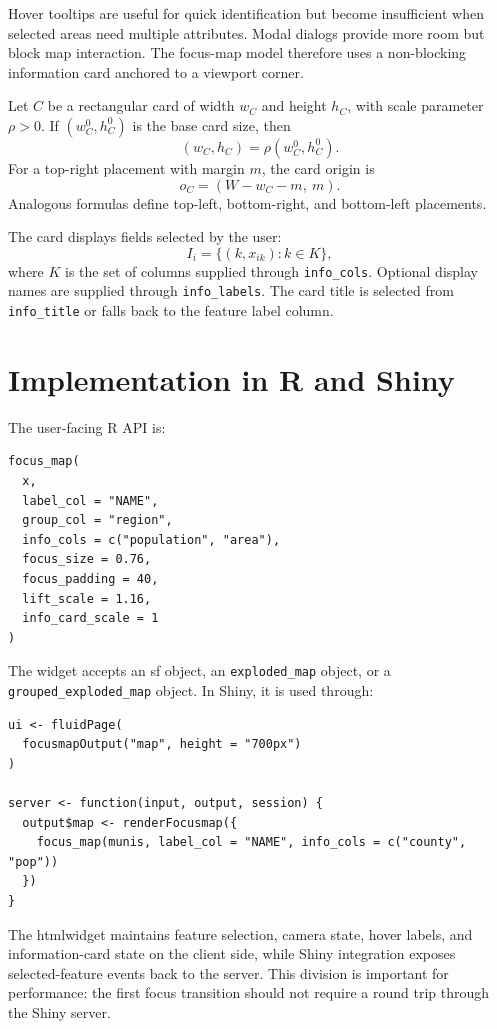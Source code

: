 \documentclass[12pt, a4paper]{article}
\numberwithin{equation}{section}
\begin{document}
Hover tooltips are useful for quick identification but become insufficient when selected areas need multiple attributes. Modal dialogs provide more room but block map interaction. The focus-map model therefore uses a non-blocking information card anchored to a viewport corner.

Let $C$ be a rectangular card of width $w_C$ and height $h_C$, with scale parameter $\rho > 0$. If $(w_C^0,h_C^0)$ is the base card size, then
\begin{equation}
  (w_C,h_C) = \rho (w_C^0,h_C^0).
\end{equation}
For a top-right placement with margin $m$, the card origin is
\begin{equation}
  o_C = (W - w_C - m,\ m).
\end{equation}
Analogous formulas define top-left, bottom-right, and bottom-left placements.

The card displays fields selected by the user:
\begin{equation}
  I_i = \{(k, x_{ik}) : k \in K\},
\end{equation}
where $K$ is the set of columns supplied through \texttt{info\_cols}. Optional display names are supplied through \texttt{info\_labels}. The card title is selected from \texttt{info\_title} or falls back to the feature label column.

\section{Implementation in R and Shiny}

The user-facing \textsf{R} API is:
\begin{lstlisting}
focus_map(
  x,
  label_col = "NAME",
  group_col = "region",
  info_cols = c("population", "area"),
  focus_size = 0.76,
  focus_padding = 40,
  lift_scale = 1.16,
  info_card_scale = 1
)
\end{lstlisting}

The widget accepts an \textsf{sf} object, an \texttt{exploded\_map} object, or a \texttt{grouped\_exploded\_map} object. In Shiny, it is used through:
\begin{lstlisting}
ui <- fluidPage(
  focusmapOutput("map", height = "700px")
)

server <- function(input, output, session) {
  output$map <- renderFocusmap({
    focus_map(munis, label_col = "NAME", info_cols = c("county", "pop"))
  })
}
\end{lstlisting}

The htmlwidget maintains feature selection, camera state, hover labels, and information-card state on the client side, while Shiny integration exposes selected-feature events back to the server. This division is important for performance: the first focus transition should not require a round trip through the Shiny server.
\end{document}
